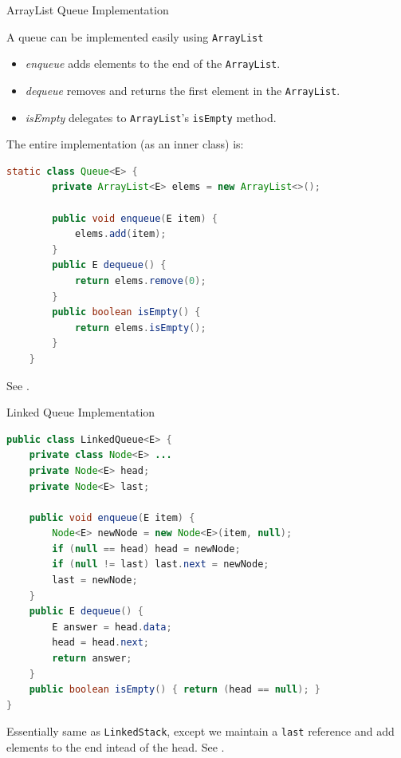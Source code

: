 \documentclass{beamer}
\begin{document}
\begin{frame}[fragile]{ArrayList Queue Implementation}

\vspace{-.05in}
A queue can be implemented easily using {\tt ArrayList}

\begin{itemize}
\item {\it enqueue} adds elements to the end of the {\tt ArrayList}.
\item {\it dequeue} removes and returns the first element in the {\tt ArrayList}.
\item {\it isEmpty} delegates to {\tt ArrayList}'s {\tt isEmpty} method.
\end{itemize}

The entire implementation (as an inner class) is:
\begin{lstlisting}[language=Java]
    static class Queue<E> {
        private ArrayList<E> elems = new ArrayList<>();

        public void enqueue(E item) {
            elems.add(item);
        }
        public E dequeue() {
            return elems.remove(0);
        }
        public boolean isEmpty() {
            return elems.isEmpty();
        }
    }
\end{lstlisting}
\vspace{-.05in}
See .

\end{frame}

\begin{frame}[fragile]{Linked Queue Implementation}

\vspace{-.05in}
\begin{lstlisting}[language=Java]
public class LinkedQueue<E> {
    private class Node<E> ...
    private Node<E> head;
    private Node<E> last;

    public void enqueue(E item) {
        Node<E> newNode = new Node<E>(item, null);
        if (null == head) head = newNode;
        if (null != last) last.next = newNode;
        last = newNode;
    }
    public E dequeue() {
        E answer = head.data;
        head = head.next;
        return answer;
    }
    public boolean isEmpty() { return (head == null); }
}
\end{lstlisting}
\vspace{-.05in}
Essentially same as {\tt LinkedStack}, except we maintain a {\tt last} reference and add elements to the end intead of the head.  See .

\end{frame}
\end{document}
